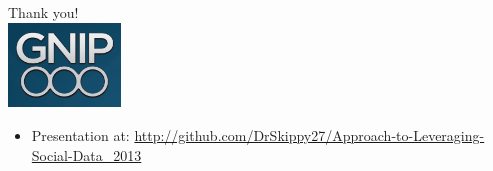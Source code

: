 \documentclass{beamer}
\begin{document}
\begin{frame}
  \begin{center}
    {\Large Thank you!}  \\ [20pt]
    \includegraphics[width=3cm]{./imgs/logo.png} \\ [15pt]
    \begin{itemize}
    \item Presentation at: \url{http://github.com/DrSkippy27/Approach-to-Leveraging-Social-Data_2013}
    \end{itemize}
  \end{center}
\end{frame}
\end{document}
